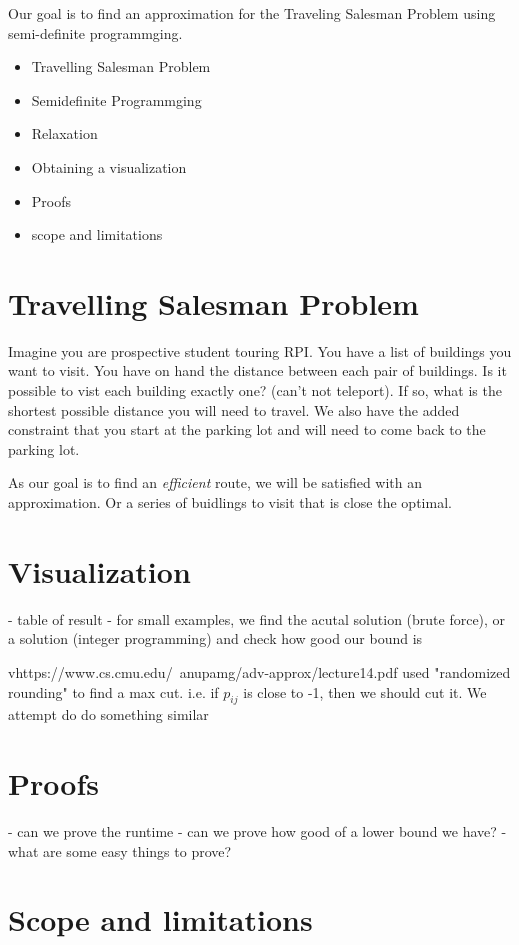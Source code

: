 \documentclass{article}
\begin{document}
Our goal is to find an approximation for the Traveling Salesman Problem using semi-definite programmging.

\begin{itemize}
\item Travelling Salesman Problem
\item Semidefinite Programmging
\item Relaxation
\item Obtaining a visualization
\item Proofs
\item scope and limitations
\end{itemize}

\section{Travelling Salesman Problem}
Imagine you are prospective student touring RPI. You have a list of buildings you want to visit.
You have on hand the distance between each pair of buildings. Is it possible to vist each building exactly one?
(can't not teleport). If so, what is the shortest possible distance you will need to travel. We also 
have the added constraint that you start at the parking lot and will need to come back to the parking lot.



As our goal is to find an \emph{efficient} route, we will be satisfied with an approximation. 
Or a series of buidlings to visit that is close the optimal.

\section{Visualization}
- table of result
- for small examples, we find the acutal solution (brute force), or a solution (integer programming) and check how 
good our bound is

vhttps://www.cs.cmu.edu/~anupamg/adv-approx/lecture14.pdf used "randomized rounding" to find a max cut.
i.e. if $p_{ij}$ is close to -1, then we should cut it. We attempt do do something similar


\section{Proofs}

- can we prove the runtime
- can we prove how good of a lower bound we have?
- what are some easy things to prove?

\section{Scope and limitations}
\end{document}
